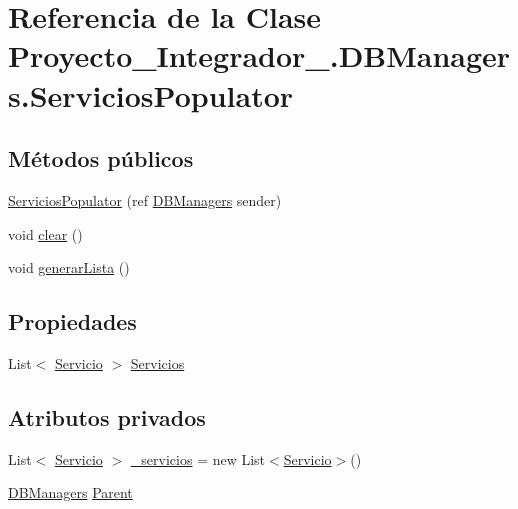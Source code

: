 \hypertarget{class_proyecto___integrador__3_1_1_d_b_managers_1_1_servicios_populator}{\section{Referencia de la Clase Proyecto\-\_\-\-Integrador\-\_.\-D\-B\-Managers.\-Servicios\-Populator}
\label{class_proyecto___integrador__3_1_1_d_b_managers_1_1_servicios_populator}
}
\subsection*{Métodos públicos}
\begin{DoxyCompactItemize}
\item 
\hyperlink{class_proyecto___integrador__3_1_1_d_b_managers_1_1_servicios_populator_a45260aa2e86962a10e44f3f7faefbf15}{Servicios\-Populator} (ref \hyperlink{class_proyecto___integrador__3_1_1_d_b_managers}{D\-B\-Managers} sender)
\item 
void \hyperlink{class_proyecto___integrador__3_1_1_d_b_managers_1_1_servicios_populator_a61cb2ea7726cffeac2da8df50a0dd347}{clear} ()
\item 
void \hyperlink{class_proyecto___integrador__3_1_1_d_b_managers_1_1_servicios_populator_a9ac6be7f5ecdbdadd850b3519a985f75}{generar\-Lista} ()
\end{DoxyCompactItemize}
\subsection*{Propiedades}
\begin{DoxyCompactItemize}
\item 
List$<$ \hyperlink{class_proyecto___integrador__3_1_1_tipos_dato_1_1_servicio}{Servicio} $>$ \hyperlink{class_proyecto___integrador__3_1_1_d_b_managers_1_1_servicios_populator_a5c0044cf4a9e52ee30c25cfcb8112876}{Servicios}
\end{DoxyCompactItemize}
\subsection*{Atributos privados}
\begin{DoxyCompactItemize}
\item 
List$<$ \hyperlink{class_proyecto___integrador__3_1_1_tipos_dato_1_1_servicio}{Servicio} $>$ \hyperlink{class_proyecto___integrador__3_1_1_d_b_managers_1_1_servicios_populator_af7501f1e6be90cfec6b9b974b6d8b911}{\-\_\-servicios} = new List$<$\hyperlink{class_proyecto___integrador__3_1_1_tipos_dato_1_1_servicio}{Servicio}$>$()
\item 
\hyperlink{class_proyecto___integrador__3_1_1_d_b_managers}{D\-B\-Managers} \hyperlink{class_proyecto___integrador__3_1_1_d_b_managers_1_1_servicios_populator_a56aa6fea49cfd991726dc8c67e4e1742}{Parent}
\end{DoxyCompactItemize}


